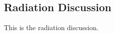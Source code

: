 \subsection{Radiation Discussion}
\label{sec:Radiation-Results-Discussion}

This is the radiation discussion.
